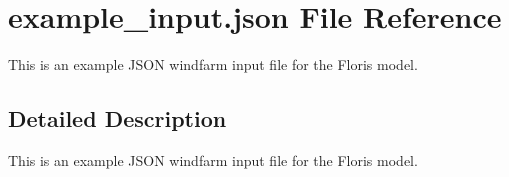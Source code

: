 \hypertarget{example__input_8json}{}\section{example\+\_\+input.\+json File Reference}
\label{example__input_8json}


This is an example J\+S\+ON windfarm input file for the Floris model.  




\subsection{Detailed Description}
This is an example J\+S\+ON windfarm input file for the Floris model. 

